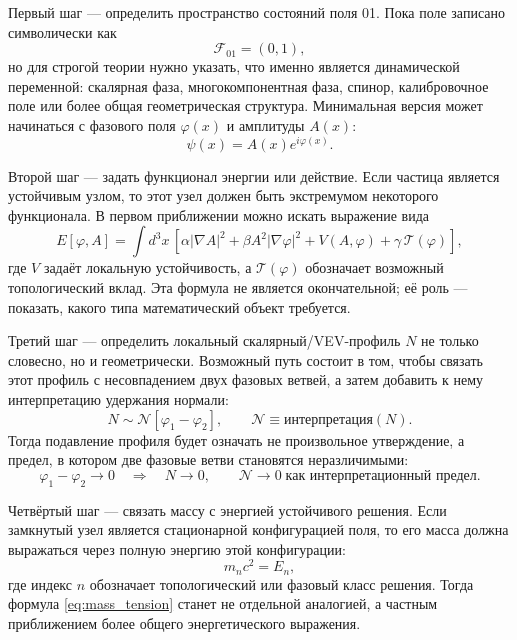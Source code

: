 \documentclass[11pt,a4paper]{article}
\newcommand{\field}{\mathcal{F}_{01}}
\newcommand{\phase}{\varphi}
\newcommand{\normal}{\mathcal{N}}
\begin{document}
Первый шаг --- определить пространство состояний поля 01. Пока поле записано символически как
\begin{equation}
\field=(0,1),
\end{equation}
но для строгой теории нужно указать, что именно является динамической переменной: скалярная фаза, многокомпонентная фаза, спинор, калибровочное поле или более общая геометрическая структура. Минимальная версия может начинаться с фазового поля $\phase(x)$ и амплитуды $A(x)$:
\begin{equation}
\psi(x)=A(x)e^{i\phase(x)}.
\end{equation}

Второй шаг --- задать функционал энергии или действие. Если частица является устойчивым узлом, то этот узел должен быть экстремумом некоторого функционала. В первом приближении можно искать выражение вида
\begin{equation}
E[\phase,A]=\int d^3x\,\left[\alpha |\nabla A|^2+\beta A^2|\nabla\phase|^2+V(A,\phase)+\gamma\,\mathcal{T}(\phase)\right],
\end{equation}
где $V$ задаёт локальную устойчивость, а $\mathcal{T}(\phase)$ обозначает возможный топологический вклад. Эта формула не является окончательной; её роль --- показать, какого типа математический объект требуется.

Третий шаг --- определить локальный скалярный/VEV-профиль $N$ не только словесно, но и геометрически. Возможный путь состоит в том, чтобы связать этот профиль с несовпадением двух фазовых ветвей, а затем добавить к нему интерпретацию удержания нормали:
\begin{equation}
N \sim \mathcal{N}\left[\phase_1-\phase_2\right], \qquad \normal \equiv \text{интерпретация}(N).
\end{equation}
Тогда подавление профиля будет означать не произвольное утверждение, а предел, в котором две фазовые ветви становятся неразличимыми:
\begin{equation}
\phase_1-\phase_2 \to 0 \quad \Rightarrow \quad N \to 0, \qquad \normal \to 0 \;\text{как интерпретационный предел}.
\end{equation}

Четвёртый шаг --- связать массу с энергией устойчивого решения. Если замкнутый узел является стационарной конфигурацией поля, то его масса должна выражаться через полную энергию этой конфигурации:
\begin{equation}
m_n c^2 = E_n,
\end{equation}
где индекс $n$ обозначает топологический или фазовый класс решения. Тогда формула \eqref{eq:mass_tension} станет не отдельной аналогией, а частным приближением более общего энергетического выражения.
\end{document}
